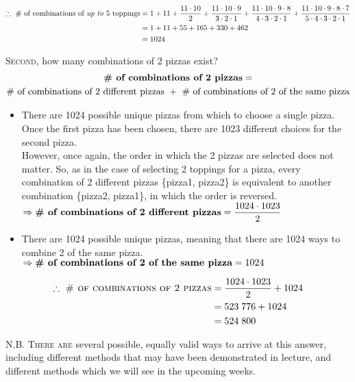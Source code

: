 \documentclass{article}
\begin{document}
\begin{align*}
\therefore\text{ \# of combinations of \textit{up to} 5 toppings}& =1+11+\dfrac{11\cdot 10}{2}+\dfrac{11\cdot 10\cdot 9}{3\cdot 2\cdot 1}+\dfrac{11\cdot 10\cdot 9\cdot 8}{4\cdot 3\cdot 2\cdot 1}+\dfrac{11\cdot 10\cdot 9\cdot 8\cdot 7}{5\cdot 4\cdot 3\cdot 2\cdot 1}\\
& =1+11+55+165+330+462\\
& =1024
\end{align*}

\textsc{Second,} how many combinations of 2 pizzas exist?
\begin{multline*}
\text{\bf\# of combinations of 2 pizzas}=\\
\text{\# of combinations of 2 different pizzas }+\text{ \# of combinations of 2 of the same pizza}
\end{multline*}

\begin{itemize}
\item There are 1024 possible unique pizzas from which to choose a single pizza. Once the first pizza has been chosen, there are 1023 different choices for the second pizza.\\[1ex]
However, once again, the order in which the 2 pizzas are selected does not matter. So, as in the case of selecting 2 toppings for a pizza, every combination of 2 different pizzas \{pizza1, pizza2\} is equivalent to another combination \{pizza2, pizza1\}, in which the order is reversed.\\[1ex]
$\Rightarrow\text{\bf\# of combinations of 2 different pizzas}=\dfrac{1024\cdot 1023}{2}$
\item There are 1024 possible unique pizzas, meaning that there are 1024 ways to combine 2 of the same pizza.\\[1ex]
$\Rightarrow\text{\bf\# of combinations of 2 of the same pizza}=1024$
\end{itemize}

\begin{align*}
\therefore\text{ \sc\# of combinations of 2 pizzas}& =\dfrac{1024\cdot 1023}{2}+1024\\
& =523\;776+1024\\
& =524\;800
\end{align*}

\textsc{N.B. There are} several possible, equally valid ways to arrive at this answer, including different methods that may have been demonstrated in lecture, and different methods which we will see in the upcoming weeks.
\end{document}
